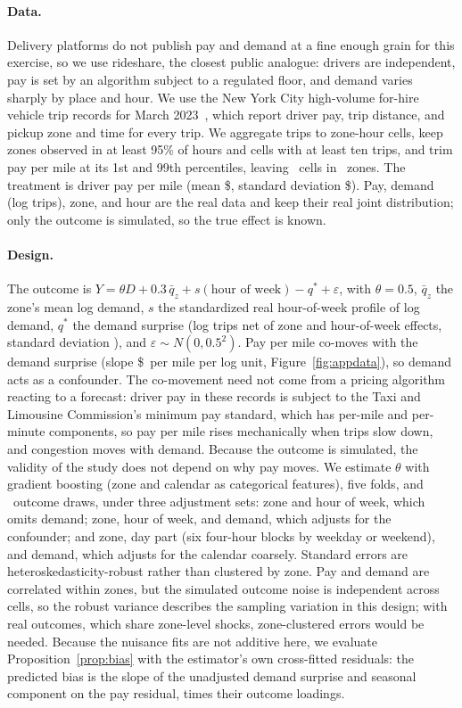 \documentclass[11pt]{article}
\theoremstyle{remark}
\begin{document}
\paragraph{Data.} Delivery platforms do not publish pay and demand at a fine enough grain for this exercise, so we use rideshare, the closest public analogue: drivers are independent, pay is set by an algorithm subject to a regulated floor, and demand varies sharply by place and hour. We use the New York City high-volume for-hire vehicle trip records for March 2023~\citep{tlc2023}, which report driver pay, trip distance, and pickup zone and time for every trip. We aggregate trips to zone-hour cells, keep zones observed in at least 95\% of hours and cells with at least ten trips, and trim pay per mile at its 1st and 99th percentiles, leaving \AppN\ cells in \AppZones\ zones. The treatment is driver pay per mile (mean \$\AppPayMean, standard deviation \$\AppPaySD). Pay, demand (log trips), zone, and hour are the real data and keep their real joint distribution; only the outcome is simulated, so the true effect is known.

\paragraph{Design.} The outcome is $Y = \theta D + 0.3\,\bar q_z + s(\text{hour of week}) - q^{\ast} + \varepsilon$, with $\theta = 0.5$, $\bar q_z$ the zone's mean log demand, $s$ the standardized real hour-of-week profile of log demand, $q^{\ast}$ the demand surprise (log trips net of zone and hour-of-week effects, standard deviation \AppSurpriseSD), and $\varepsilon \sim N(0, 0.5^2)$. Pay per mile co-moves with the demand surprise (slope \$\AppSlope\ per mile per log unit, Figure~\ref{fig:appdata}), so demand acts as a confounder. The co-movement need not come from a pricing algorithm reacting to a forecast: driver pay in these records is subject to the Taxi and Limousine Commission's minimum pay standard, which has per-mile and per-minute components, so pay per mile rises mechanically when trips slow down, and congestion moves with demand. Because the outcome is simulated, the validity of the study does not depend on why pay moves. We estimate $\theta$ with gradient boosting (zone and calendar as categorical features), five folds, and \AppDraws\ outcome draws, under three adjustment sets: zone and hour of week, which omits demand; zone, hour of week, and demand, which adjusts for the confounder; and zone, day part (six four-hour blocks by weekday or weekend), and demand, which adjusts for the calendar coarsely. Standard errors are heteroskedasticity-robust rather than clustered by zone. Pay and demand are correlated within zones, but the simulated outcome noise is independent across cells, so the robust variance describes the sampling variation in this design; with real outcomes, which share zone-level shocks, zone-clustered errors would be needed. Because the nuisance fits are not additive here, we evaluate Proposition~\ref{prop:bias} with the estimator's own cross-fitted residuals: the predicted bias is the slope of the unadjusted demand surprise and seasonal component on the pay residual, times their outcome loadings.
\end{document}
